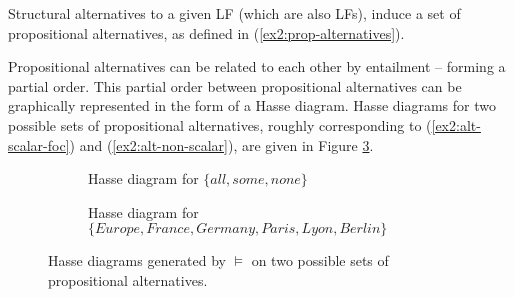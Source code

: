 Structural alternatives to a given LF (which are also LFs), induce a set of propositional alternatives, as defined in (\ref{ex2:prop-alternatives}).

\begin{exe}
	\label{ex2:prop-alternatives}
\end{exe}

Propositional alternatives can be related to each other by entailment -- forming a partial order. This partial order between propositional alternatives can be graphically represented in the form of a Hasse diagram. Hasse diagrams for two possible sets of propositional alternatives, roughly corresponding to (\ref{ex2:alt-scalar-foc}) and (\ref{ex2:alt-non-scalar}), are given in Figure \ref{fig2:hasse}.

\begin{figure}[H]
	\centering
	\begin{subfigure}[t]{.45\linewidth}
		\centering
		\caption{Hasse diagram for $\lbrace \textit{all}, \textit{some}, \textit{none} \rbrace$}\label{fig2:hasse-scalar} 
	\end{subfigure}	
	\hfill
	\begin{subfigure}[t]{.45\linewidth}
		\centering
		\caption{Hasse diagram for $\lbrace \textit{Europe}, \textit{France}, \textit{Germany}, \textit{Paris}, \textit{Lyon}, \textit{Berlin} \rbrace$}\label{fig2:hasse-locations}
	\end{subfigure}
	\caption{Hasse diagrams generated by $\vDash$ on two possible sets of propositional alternatives.}\label{fig2:hasse}
\end{figure}


